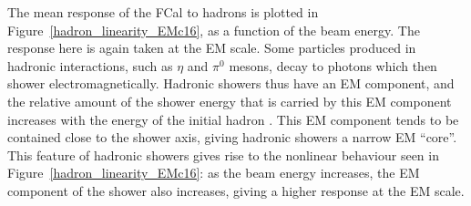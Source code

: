  
 
The mean response of the FCal to hadrons is plotted in Figure~\ref{hadron_linearity_EMc16}, as a function of the beam energy. The response here is again taken at the EM scale.
Some particles produced in hadronic interactions, such as $\eta$ and $\pi^0$ mesons, decay to photons which then shower electromagnetically.  Hadronic showers thus have an EM component, and the relative amount of the shower energy that is carried by this EM component increases with the energy of the initial hadron \cite{wigmans2000calorimetry}. This EM component tends to be contained close to the shower axis, giving hadronic showers a narrow EM ``core''. This feature of hadronic showers gives rise to the nonlinear behaviour seen in Figure~\ref{hadron_linearity_EMc16}: as the beam energy increases, the EM component of the shower also increases, giving a higher response at the EM scale.


%
%
%
%
%
%
%
%
%
%


